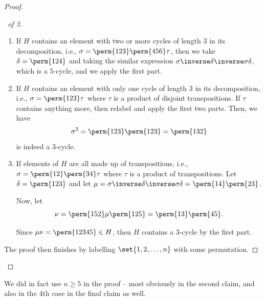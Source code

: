 \begin{proof}
\begin{proof}[\proofname\ of 3]
\begin{enumerate}
            Since \(\tau\) is disjoint with \(\set{1, 2, 3}\) by assumption, it commutes with \(\delta\), and by assumption, also with \(\perm{1 2 {\ldots} r}\).

            We now expand this product to get
            \begin{align*}
                \sigma\inverse \delta\inverse \sigma \delta &= \perm{r {\ldots} 2 1} \perm{1 3 2} \perm{1 2 {\ldots} r} \perm{1 2 3}\\
                &= \perm{2 3 r},
            \end{align*}
            which gives a \(3\)-cycle.

            \item If \(H\) contains an element with two or more cycles of length \(3\) in its decomposition, i.e., \(\sigma = \perm{1 2 3} \perm{4 5 6} \tau\), then we take \(\delta = \perm{1 2 4}\) and taking the similar expression \(\sigma \inverse \delta \inverse \sigma \delta\), which is a \(5\)-cycle, and we apply the first part.
            
            \item If \(H\) contains an element with only one cycle of length \(3\) in its decomposition, i.e., \(\sigma = \perm{1 2 3} \tau\) where \(\tau\) is a product of disjoint transpositions. If \(\tau\) contains anything more, then relabel and apply the first two parts. Then, we have
            \[
                \sigma^2 = \perm{1 2 3} \perm{1 2 3} = \perm{1 3 2}
            \]
            is indeed a \(3\)-cycle.

            \item If elements of \(H\) are all made up of transpositions, i.e., \(\sigma = \perm{12} \perm{34} \tau\) where \(\tau\) is a product of transpositions. Let \(\delta = \perm{1 2 3}\) and let \(\mu = \sigma\inverse \delta\inverse \sigma \delta = \perm{14} \perm{23}\).
            
            Now, let
            \[
                \nu = \perm{1 5 2} \mu \perm{1 2 5} = \perm{1 3}\perm{4 5}.
            \]

            Since \(\mu \nu = \perm{1 2 3 4 5} \in H\), then \(H\) contains a \(3\)-cycle by the first part. 
        \end{enumerate}

        The proof then finishes by labelling \(\set{1, 2, \ldots, n}\) with some permutation.
    \end{proof}
\end{proof}

\begin{remark}
    We did in fact use \(n \geq 5\) in the proof -- most obviously in the second claim, and also in the 4th case in the final claim as well.
\end{remark}